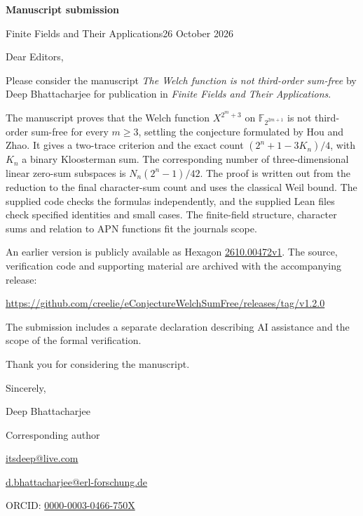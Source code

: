 \documentclass[11pt]{article}
\begin{document}
{\Large\bfseries Manuscript submission}\par
Finite Fields and Their Applications\hfill 26 October 2026

Dear Editors,

Please consider the manuscript \emph{The Welch function is not third-order sum-free} by Deep Bhattacharjee for publication in \emph{Finite Fields and Their Applications}.

The manuscript proves that the Welch function $X^{2^m+3}$ on $\mathbb{F}_{2^{2m+1}}$ is not third-order sum-free for every $m\ge3$, settling the conjecture formulated by Hou and Zhao. It gives a two-trace criterion and the exact count $(2^n+1-3K_n)/4$, with $K_n$ a binary Kloosterman sum. The corresponding number of three-dimensional linear zero-sum subspaces is $N_n(2^n-1)/42$. The proof is written out from the reduction to the final character-sum count and uses the classical Weil bound. The supplied code checks the formulas independently, and the supplied Lean files check specified identities and small cases. The finite-field structure, character sums and relation to APN functions fit the journal\textquotesingle s scope.

An earlier version is publicly available as Hexagon \href{https://hexagonmath.org/2610.00472v1}{2610.00472v1}. The source, verification code and supporting material are archived with the accompanying release:
\begin{center}\url{https://github.com/creelie/eConjectureWelchSumFree/releases/tag/v1.2.0}\end{center}
The submission includes a separate declaration describing AI assistance and the scope of the formal verification.

Thank you for considering the manuscript.

Sincerely,\par
Deep Bhattacharjee\par
Corresponding author\par
\href{mailto:itsdeep@live.com}{itsdeep@live.com}\par
\href{mailto:d.bhattacharjee@erl-forschung.de}{d.bhattacharjee@erl-forschung.de}\par
ORCID: \href{https://orcid.org/0000-0003-0466-750X}{0000-0003-0466-750X}
\end{document}

